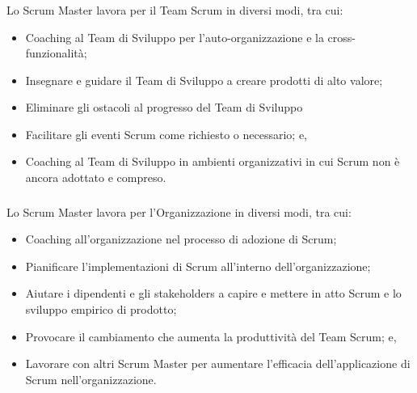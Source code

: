 \subsubsection*{\color{SteelBlue}{Servizio dello Scrum Master per il Team Scrum}} %
\label{ssub:sm_service_to_team}
Lo Scrum Master lavora per il Team Scrum in diversi modi, tra cui:
\begin{itemize}
	\item Coaching al Team di Sviluppo per l'auto-organizzazione e la cross-funzionalit\`a;
	\item Insegnare e guidare il Team di Sviluppo a creare prodotti di alto valore;
	\item Eliminare gli ostacoli al progresso del Team di Sviluppo
	\item Facilitare gli eventi Scrum come richiesto o necessario; e,
	\item Coaching al Team di Sviluppo in ambienti organizzativi in cui Scrum non \`e ancora adottato e compreso.
\end{itemize}

\subsubsection*{\color{SteelBlue}{Servizio dello Scrum Master per l'Organizzazione}} %
\label{ssub:sm_service_to_org}
Lo Scrum Master lavora per l'Organizzazione in diversi modi, tra cui:
\begin{itemize}
	\item Coaching all'organizzazione nel processo di adozione di Scrum;
	\item Pianificare l'implementazioni di Scrum all'interno dell'organizzazione;
	\item Aiutare i dipendenti e gli stakeholders a capire e mettere in atto Scrum e lo sviluppo empirico di prodotto;
	\item Provocare il cambiamento che aumenta la produttivit\`a del Team Scrum; e,
	\item Lavorare con altri Scrum Master per aumentare l'efficacia dell'applicazione di Scrum nell'organizzazione.
\end{itemize}


